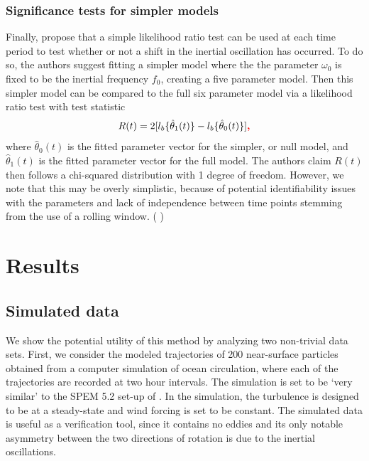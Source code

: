 \documentclass{stat572Style}
\newcommand{\vmadd}[1]{\textbf{\color{red}{#1}}}
\newcommand{\vmcomment}[1]{({\color{blue}{VM's comment:}} \textbf{\color{blue}{#1}})}
\begin{document}
\subsubsection{Significance tests for simpler models}
\label{sec: sig}
Finally, \citet{Sykulski2016} propose that a simple likelihood ratio test can be used at each time period to test whether or not a shift in the inertial oscillation has occurred. 
To do so, the authors suggest fitting a simpler model where the the parameter $\omega_{0}$ is fixed to be the inertial frequency $f_{0}$, creating a five parameter model. 
Then this simpler model can be compared to the full six parameter model via a likelihood ratio test with test statistic
\begin{equation}
\label{eq: LRT}
R(t) = 2[l_{b} \{\hat{\theta}_{1}(t) \} - l_{b}\{\hat{\theta}_{0}(t) \} ]\vmadd{,}
\end{equation}
where $\hat{\theta}_{0}(t)$ is the fitted parameter vector for the simpler, or null model, and $\hat{\theta}_{1}(t)$ is the fitted parameter vector for the full model.
 The authors claim $R(t)$ then follows a chi-squared distribution with 1 degree of freedom. 
 However, we note that this may be overly simplistic, because of potential identifiability issues with the parameters and lack of independence between time points stemming from the use of a rolling window. \vmcomment{I don't think the lack of independence between time points has an impact on the LRT, but using multiple LRTs without multiple testing correction, which is complicated by non-independence, is the main problem here, I think.}
 

\section{Results}
\subsection{Simulated data}
\par We show the potential utility of this method by analyzing two non-trivial data sets.  
First, we consider the modeled trajectories of 200 near-surface particles obtained from a computer simulation of ocean circulation, where each of the trajectories are recorded at two hour intervals. 
The simulation is set to be `very similar' to the SPEM 5.2 set-up of \citet{Danioux2008}. 
In the  simulation, the turbulence is designed to be at a steady-state and wind forcing is set to be  constant. 
The simulated data is useful as a verification tool, since  it contains no eddies and its only  notable asymmetry between the two directions of rotation is due to the inertial oscillations. 
\end{document}
